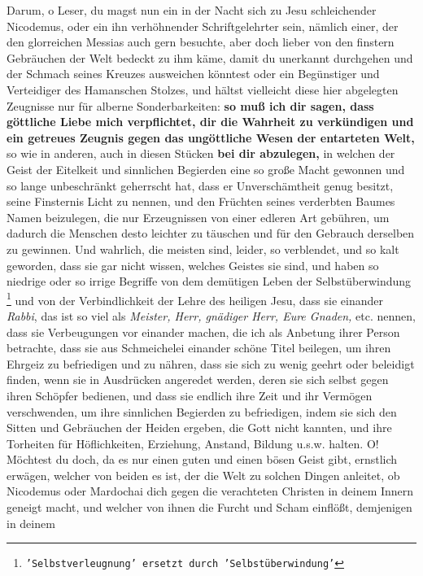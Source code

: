 Darum, o Leser, du magst nun ein in der Nacht sich zu Jesu schleichender
Nicodemus, oder ein ihn verhöhnender Schriftgelehrter
sein, nämlich einer, der
den glorreichen Messias auch gern besuchte, aber doch lieber von den finstern
Gebräuchen der Welt bedeckt zu ihm käme, damit du unerkannt durchgehen und der
Schmach seines Kreuzes ausweichen könntest oder ein Begünstiger und Verteidiger
des Hamanschen 
Stolzes, und hältst vielleicht diese hier abgelegten
Zeugnisse
nur für alberne Sonderbarkeiten: \textbf{so muß ich dir sagen, dass göttliche
Liebe mich
verpflichtet, dir die Wahrheit zu verkündigen und ein getreues
Zeugnis gegen das
ungöttliche Wesen der entarteten Welt,} so wie in anderen, auch in diesen Stücken
\textbf{bei dir abzulegen,} in welchen der Geist der Eitelkeit und sinnlichen
Begierden
eine so große Macht gewonnen und so lange unbeschränkt geherrscht hat, dass er
Unverschämtheit genug besitzt, seine Finsternis Licht zu nennen, und den
Früchten seines verderbten Baumes Namen beizulegen, die nur Erzeugnissen von
einer edleren Art gebühren, um dadurch die Menschen desto leichter zu täuschen
und für den Gebrauch derselben zu gewinnen. Und wahrlich, die meisten sind,
leider, so verblendet, und so kalt geworden, dass sie gar nicht wissen,
welches Geistes sie sind, und haben so niedrige oder so irrige Begriffe von dem
demütigen Leben der Selbstüberwindung
\footnote{\texttt{'Selbstverleugnung' ersetzt durch 'Selbstüberwindung'}} und
von der Verbindlichkeit der Lehre des
heiligen Jesu, dass sie einander \textit{Rabbi}, das ist so viel als
\textit{Meister,
Herr, gnädiger Herr, Eure Gnaden,} etc. nennen, dass sie Verbeugungen vor
einander machen, die ich als Anbetung ihrer Person betrachte, dass sie aus
Schmeichelei einander schöne Titel beilegen, um ihren Ehrgeiz zu befriedigen und
zu nähren, dass sie sich zu wenig geehrt oder beleidigt finden, wenn sie in
Ausdrücken angeredet werden, deren sie sich selbst gegen ihren Schöpfer
bedienen, und dass sie endlich ihre Zeit und ihr Vermögen verschwenden, um ihre
sinnlichen Begierden zu befriedigen, indem sie sich den Sitten und Gebräuchen
der Heiden ergeben, die Gott nicht kannten, und ihre Torheiten für
Höflichkeiten, Erziehung, Anstand, Bildung u.s.w. halten. O! Möchtest
du doch, da es nur einen guten und einen bösen Geist gibt, ernstlich erwägen,
welcher von beiden es ist, der die Welt zu solchen Dingen anleitet, ob Nicodemus
oder Mardochai dich gegen die verachteten Christen in
deinem Innern geneigt
macht, und welcher von ihnen die Furcht und Scham einflößt, demjenigen in deinem
